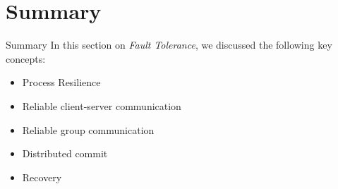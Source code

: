 \section{Summary}
  \begin{slide}{Summary}
    In this section on \emph{Fault Tolerance},
    we discussed the following key concepts:
    \begin{itemize}
      \item Process Resilience 
      \item Reliable client-server communication
      \item Reliable group communication
      \item Distributed commit
      \item Recovery
    \end{itemize}
  \end{slide}
